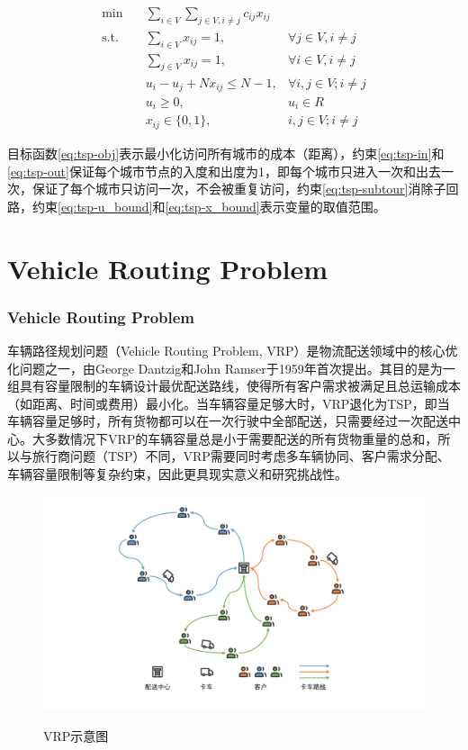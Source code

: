 \documentclass[fontset=none]{ctexart}
\begin{document}
\begin{theorem}
\begin{align}
    \min \quad & \sum_{i \in V}\sum_{j \in V, i \neq j} c_{ij}x_{ij} & \label{eq:tsp-obj}\\
    \text{s.t.} \quad & \sum_{i \in V} x_{ij} = 1, & \forall j \in V, i \neq j\label{eq:tsp-in}\\
    \quad & \sum_{j \in V} x_{ij} = 1, & \forall i \in V, i \neq j \label{eq:tsp-out}\\
    \quad & u_i - u_j + Nx_{ij} \leq N - 1, & \forall i, j \in V; i \neq j \label{eq:tsp-subtour}\\
    \quad & u_i \geq 0, & u_i \in R \label{eq:tsp-u_bound}\\
    \quad & x_{ij} \in \{0, 1\}, & i, j \in V; i \neq j\label{eq:tsp-x_bound}
\end{align}

目标函数\eqref{eq:tsp-obj}表示最小化访问所有城市的成本（距离），约束\eqref{eq:tsp-in}和\eqref{eq:tsp-out}保证每个城市节点的入度和出度为1，即每个城市只进入一次和出去一次，保证了每个城市只访问一次，不会被重复访问，约束\eqref{eq:tsp-subtour}消除子回路，约束\eqref{eq:tsp-u_bound}和\eqref{eq:tsp-x_bound}表示变量的取值范围。
\end{theorem}

\part{Vehicle Routing Problem}
\section{Vehicle Routing Problem}

车辆路径规划问题（Vehicle Routing Problem, VRP）是物流配送领域中的核心优化问题之一，由George Dantzig和John Ramser于1959年首次提出\cite{1959The}。其目的是为一组具有容量限制的车辆设计最优配送路线，使得所有客户需求被满足且总运输成本（如距离、时间或费用）最小化。当车辆容量足够大时，VRP退化为TSP，即当车辆容量足够时，所有货物都可以在一次行驶中全部配送，只需要经过一次配送中心。大多数情况下VRP的车辆容量总是小于需要配送的所有货物重量的总和，所以与旅行商问题（TSP）不同，VRP需要同时考虑多车辆协同、客户需求分配、车辆容量限制等复杂约束，因此更具现实意义和研究挑战性。

\begin{figure}[!htb]
    \centering
    \includegraphics[width=\linewidth]{images/VRP.pdf}\\
    \caption{VRP示意图}
\end{figure}
\end{document}

